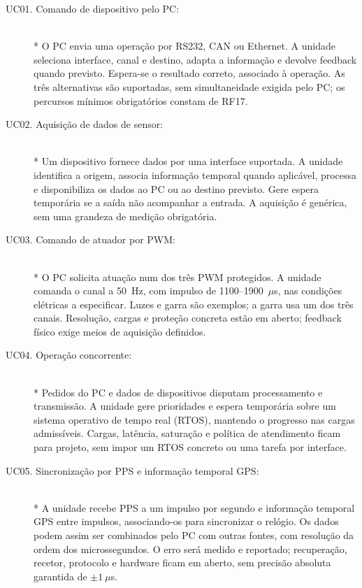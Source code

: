 \begin{description}
    \item[UC01. Comando de dispositivo pelo PC:] \hfill\\*
    O PC envia uma operação por RS232, CAN ou Ethernet. A unidade
    seleciona interface, canal e destino, adapta a informação e devolve
    feedback quando previsto. Espera-se o resultado correto, associado
    à operação. As três alternativas são suportadas, sem simultaneidade
    exigida pelo PC; os percursos mínimos obrigatórios constam de RF17.

    \item[UC02. Aquisição de dados de sensor:] \hfill\\*
    Um dispositivo fornece dados por uma interface suportada. A unidade
    identifica a origem, associa informação temporal quando aplicável,
    processa e disponibiliza os dados ao PC ou ao destino previsto.
    Gere espera temporária se a saída não acompanhar a entrada.
    A aquisição é genérica, sem uma grandeza de medição obrigatória.

    \item[UC03. Comando de atuador por PWM:] \hfill\\*
    O PC solicita atuação num dos três PWM protegidos. A unidade comanda
    o canal a 50~Hz, com impulso de 1100--1900~$\mu$s, nas condições
    elétricas a especificar. Luzes e garra são exemplos; a garra usa
    um dos três canais. Resolução, cargas e proteção concreta estão
    em aberto; feedback físico exige meios de aquisição definidos.

    \item[UC04. Operação concorrente:] \hfill\\*
    Pedidos do PC e dados de dispositivos disputam processamento e
    transmissão. A unidade gere prioridades e espera temporária sobre
    um sistema operativo de tempo real (RTOS), mantendo o progresso nas cargas admissíveis. Cargas, latência,
    saturação e política de atendimento ficam para projeto, sem impor
    um RTOS concreto ou uma tarefa por interface.

    \item[UC05. Sincronização por PPS e informação temporal GPS:] \hfill\\*
    A unidade recebe PPS a um impulso por segundo e informação temporal
    GPS entre impulsos, associando-os para sincronizar o relógio.
    Os dados podem assim ser combinados pelo PC com outras fontes,
    com resolução da ordem dos microssegundos. O erro será medido e
    reportado; recuperação, recetor, protocolo e hardware ficam em aberto,
    sem precisão absoluta garantida de $\pm1~\mu$s.


\end{description}
